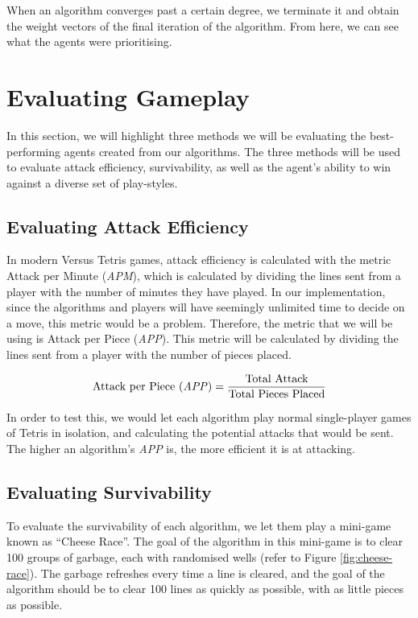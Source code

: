 \documentclass[a4paper, 12pt]{extreport}
\begin{document}
				When an algorithm converges past a certain degree, we terminate it and obtain the weight vectors of the final iteration of the algorithm. From here, we can see what the agents were prioritising.
		
		\section{Evaluating Gameplay}\label{sec:evaluation}
			
			In this section, we will highlight three methods we will be evaluating the best-performing agents created from our algorithms. The three methods will be used to evaluate attack efficiency, survivability, as well as the agent's ability to win against a diverse set of play-styles.
		
			\subsection{Evaluating Attack Efficiency}
			
				In modern Versus Tetris games, attack efficiency is calculated with the metric Attack per Minute (\textit{APM}), which is calculated by dividing the lines sent from a player with the number of minutes they have played. In our implementation, since the algorithms and players will have seemingly unlimited time to decide on a move, this metric would be a problem. Therefore, the metric that we will be using is Attack per Piece (\textit{APP}). This metric will be calculated by dividing the lines sent from a player with the number of pieces placed.
				
				\begin{equation}
					\text{Attack per Piece (\textit{APP})} = \dfrac{\text{Total Attack}}{\text{Total Pieces Placed}}
				\end{equation}
				
				In order to test this, we would let each algorithm play normal single-player games of Tetris in isolation, and calculating the potential attacks that would be sent. The higher an algorithm's \textit{APP} is, the more efficient it is at attacking.
			
			\subsection{Evaluating Survivability}
			
				To evaluate the survivability of each algorithm, we let them play a mini-game known as ``Cheese Race''. The goal of the algorithm in this mini-game is to clear 100 groups of garbage, each with randomised wells (refer to Figure \ref{fig:cheese-race}). The garbage refreshes every time a line is cleared, and the goal of the algorithm should be to clear 100 lines as quickly as possible, with as little pieces as possible.
				
\end{document}
